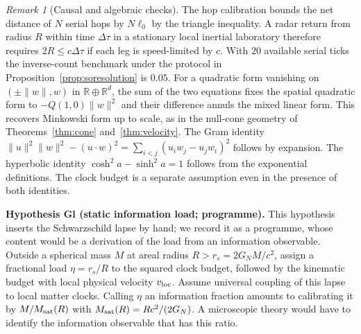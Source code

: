 \documentclass[aps,pra,onecolumn,superscriptaddress,nofootinbib,10pt]{revtex4-2}
\theoremstyle{definition}
\theoremstyle{remark}
\newtheorem{remark}[theorem]{Remark}
\begin{document}
\begin{remark}[Causal and algebraic checks]\label{ub:clockchecks}
The hop calibration bounds the net distance of $N$ serial hops by
$N\ell_0$ by the triangle inequality. A radar return from radius
$R$ within time $\Delta\tau$ in a stationary local inertial laboratory
therefore requires $2R\le c\Delta\tau$ if each leg is speed-limited
by $c$. With $20$ available serial ticks the inverse-count benchmark
under the protocol in Proposition~\ref{prop:soresolution} is $0.05$.
For a quadratic form vanishing on $(\pm\|w\|,w)$ in
$\mathbb R\oplus\mathbb R^d$, the sum of the two equations fixes
the spatial quadratic form to $-Q(1,0)\|w\|^2$ and their difference
annuls the mixed linear form. This recovers Minkowski form up to
scale, as in the null-cone geometry of Theorems~\ref{thm:cone}
and~\ref{thm:velocity}. The Gram identity
$\|u\|^2\|w\|^2-(u\cdot w)^2=\sum_{i<j}(u_iw_j-u_jw_i)^2$ follows
by expansion. The hyperbolic identity $\cosh^2a-\sinh^2a=1$ follows
from the exponential definitions. The clock budget is a separate
assumption even in the presence of both identities.
\end{remark}

\smallskip\noindent\textbf{Hypothesis Gl (static information load; programme).}\label{hyp:Gl}  This hypothesis inserts the Schwarzschild
lapse by hand; we record it as a programme, whose content would be a derivation of the load from an information
observable.  Outside a spherical mass $M$ at areal radius $R>r_s=2G_NM/c^2$,
assign a fractional load $\eta=r_s/R$ to the squared clock
budget, followed by the kinematic budget with local physical velocity
$v_{\rm loc}$. Assume universal coupling of this lapse to local
matter clocks. Calling $\eta$ an information fraction amounts to
calibrating it by $M/M_{\rm sat}(R)$ with
$M_{\rm sat}(R)=Rc^2/(2G_N)$. A microscopic theory would have to
identify the information observable that has this ratio.
\end{document}
